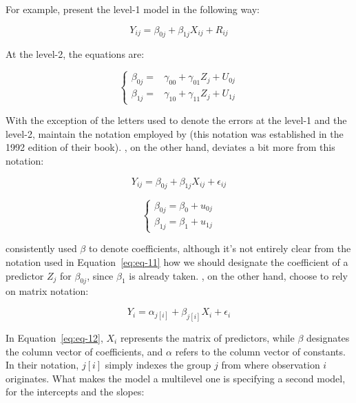 \documentclass[12pt,english]{article}\usepackage[]{graphicx}\usepackage[usenames, dvipsnames]{xcolor}
\begin{document}
For example,  present the level-1 model in the following way:

\begin{equation}
Y_{ij}=\beta_{0j}+\beta_{1j}X_{ij}+R_{ij}
\label{eq:eq-08}
\end{equation}

At the level-2, the equations are:

\begin{equation}
\begin{cases}
\beta_{0j}= & \gamma_{00}+\gamma_{01}Z_{j}+U_{0j}\\
\beta_{1j}= & \gamma_{10}+\gamma_{11}Z_{j}+U_{1j}
\end{cases}
\label{eq:eq-09}
\end{equation}

With the exception of the letters used to denote the errors at the level-1 and the level-2,  maintain the notation employed by  (this notation was established in the 1992 edition of their book). , on the other hand, deviates a bit more from this notation:

\begin{equation}
Y_{ij}=\beta_{0j}+\beta_{1j}X_{ij}+\epsilon_{ij}
\label{eq:eq-10}
\end{equation}

\begin{equation}
\begin{cases}
\beta_{0j}=\beta_0+u_{0j}\\
\beta_{1j}=\beta_1+u_{1j}
\end{cases}
\label{eq:eq-11}
\end{equation}

 consistently used $\beta$ to denote coefficients, although it's not entirely clear from the notation used in Equation~\ref{eq:eq-11} how we should designate the coefficient of a predictor $Z_j$ for $\beta_{0j}$, since $\beta_1$ is already taken. , on the other hand, choose to rely on matrix notation:

\begin{equation}
  Y_i = \alpha_{j[i]} + \beta_{j[i]}X_i + \epsilon_i
\label{eq:eq-12}
\end{equation}

In Equation~\ref{eq:eq-12}, $X_i$ represents the matrix of predictors, while $\beta$ designates the column vector of coefficients, and $\alpha$ refers to the column vector of constants. In their notation, $j[i]$ simply indexes the group $j$ from where observation $i$ originates. What makes the model a multilevel one is specifying a second model, for the intercepts and the slopes:
\end{document}
